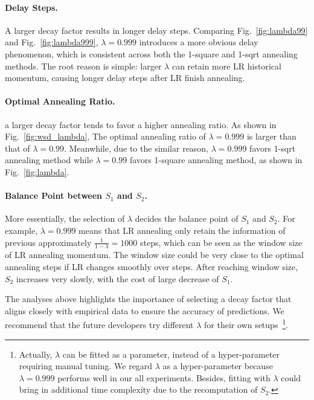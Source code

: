 \paragraph{Delay Steps.} A larger decay factor results in longer delay steps. Comparing 
Fig.~\ref{fig:lambda99} and Fig.~\ref{fig:lambda999}, $\lambda=0.999$ introduces a more obvious delay phenomenon, which is consistent across both the 1-square and 1-sqrt annealing methods.
The root reason is simple: larger $\lambda$ can retain more LR historical momentum, causing longer delay steps after LR finish annealing.

\paragraph{Optimal Annealing Ratio.} a larger decay factor tends to favor a higher annealing ratio. As shown in Fig.~\ref{fig:wsd_lambda},  
The optimal annealing ratio of $\lambda=0.999$
is larger than that of $\lambda=0.99$. Meanwhile, due to the similar reason, $\lambda=0.999$ favors 1-sqrt annealing method while $\lambda=0.99$ favors 1-square annealing method, as shown in Fig.~\ref{fig:lambda}.

\paragraph{Balance Point between $S_1$ and $S_2$.} More essentially, the selection of $\lambda$ decides the balance point of $S_1$ and $S_2$.
For example,
$\lambda=0.999$ means that LR annealing only retain the information of previous approximately $\frac{1}{1-\lambda}=1000$ steps, which can be seen as the window size of LR annealing momentum. The window size could be very close to the optimal annealing steps if LR changes smoothly over steps. After reaching window size, $S_2$ increases very slowly, with the cost of large decrease of $S_1$.

The analyses above highlights the importance of selecting a decay factor that aligns closely with empirical data to ensure the accuracy of predictions. 
We recommend that the future developers try different $\lambda$ for their own setups~\footnote{Actually, $\lambda$ can be fitted as a parameter, instead of a hyper-parameter requiring manual tuning. We regard $\lambda$ as a hyper-parameter because $\lambda=0.999$ performs well in our all experiments. Besides, fitting with $\lambda$ could bring in additional time complexity due to the recomputation of $S_2$.}.



